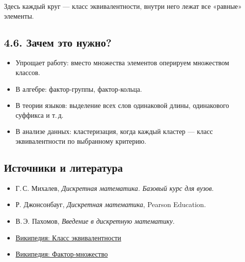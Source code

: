 \documentclass{article}
\begin{document}
Здесь каждый круг — класс эквивалентности, внутри него лежат все «равные» элементы.

\subsection*{4.6. Зачем это нужно?}

\begin{itemize}[leftmargin=*]
  \item Упрощает работу: вместо множества элементов оперируем множеством классов.
  \item В алгебре: фактор‑группы, фактор‑кольца.
  \item В теории языков: выделение всех слов одинаковой длины, одинакового суффикса и т.\,д.
  \item В анализе данных: кластеризация, когда каждый кластер — класс эквивалентности по выбранному критерию.
\end{itemize}

\subsection*{Источники и литература}

\begin{itemize}
  \item Г.\,С. Михалев, \emph{Дискретная математика. Базовый курс для вузов}.
  \item Р. Джонсонбауг, \emph{Дискретная математика}, Pearson Education.
  \item В.\,Э. Пахомов, \emph{Введение в дискретную математику}.
  \item \href{https://ru.wikipedia.org/wiki/Класс_эквивалентности}{Википедия: Класс эквивалентности}
  \item \href{https://ru.wikipedia.org/wiki/Фактор-множество}{Википедия: Фактор‑множество}
\end{itemize}
\end{document}
